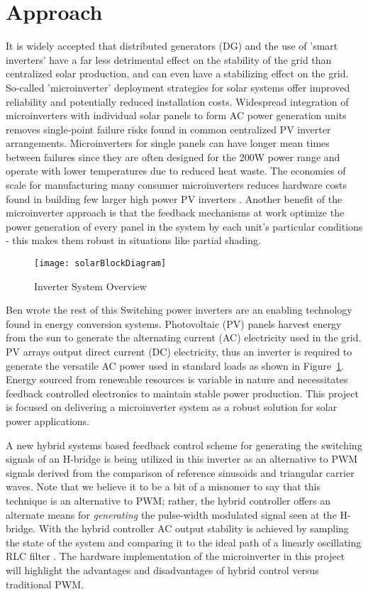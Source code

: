 \section{Approach}
It is widely accepted that distributed generators (DG) and the use of 'smart inverters' have a far less detrimental effect on the stability of the grid than centralized solar production, and can even have a stabilizing effect on the grid. So-called 'microinverter' deployment strategies for solar systems offer improved reliability and potentially reduced installation costs. Widespread integration of microinverters with individual solar panels to form AC power generation units removes single-point failure risks found in common centralized PV inverter arrangements. Microinverters for single panels can have longer mean times between failures since they are often designed for the 200W power range and operate with lower temperatures due to reduced heat waste. The economies of scale for manufacturing many consumer microinverters reduces hardware costs found in building few larger high power PV inverters \cite{microchip}. Another benefit of the microinverter approach is that the feedback mechanisms at work optimize the power generation of every panel in the system by each unit's particular conditions - this makes them robust in situations like partial shading.

\begin{figure}[h]
\centering
\texttt{[image: solarBlockDiagram]}
\caption{Inverter System Overview}
\label{solarBlock}
\end{figure}

{Ben wrote the rest of this}
Switching power inverters are an enabling technology found in energy conversion systems. Photovoltaic (PV) panels harvest energy from the sun to generate the alternating current (AC) electricity used in the grid. PV arrays output direct current (DC) electricity, thus an inverter is required to generate the versatile AC power used in standard loads as shown in Figure~\ref{solarBlock}. Energy sourced from renewable resources is variable in nature and necessitates feedback controlled electronics to maintain stable power production. This project is focused on delivering a microinverter system as a robust solution for solar power applications. 

A new hybrid systems based feedback control scheme for generating the switching signals of an H-bridge is being utilized in this inverter as an alternative to PWM signals derived from the comparison of reference sinusoids and triangular carrier waves. Note that we believe it to be a bit of a misnomer to say that this technique is an alternative to PWM; rather, the hybrid controller offers an alternate means for \emph{generating} the pulse-width modulated signal seen at the H-bridge. 
With the hybrid controller AC output stability is achieved by sampling the state of the system and comparing it to the ideal path of a linearly oscillating RLC filter \cite{ricardo}. The hardware implementation of the microinverter in this project will highlight the advantages and disadvantages of hybrid control versus traditional PWM.

